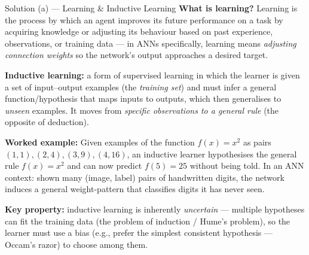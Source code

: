 \documentclass[12pt,a4paper]{article}
\begin{document}
\begin{solbox}{Solution (a) --- Learning \& Inductive Learning}
\textbf{What is learning?} Learning is the process by which an agent improves its future performance on a task by acquiring knowledge or adjusting its behaviour based on past experience, observations, or training data --- in ANNs specifically, learning means \emph{adjusting connection weights} so the network's output approaches a desired target.

\textbf{Inductive learning:} a form of supervised learning in which the learner is given a set of input--output examples (the \emph{training set}) and must infer a general function/hypothesis that maps inputs to outputs, which then generalises to \emph{unseen} examples. It moves from \emph{specific observations to a general rule} (the opposite of deduction).

\textbf{Worked example:} Given examples of the function $f(x) = x^2$ as pairs $(1,1),(2,4),(3,9),(4,16)$, an inductive learner hypothesises the general rule $f(x)=x^2$ and can now predict $f(5)=25$ without being told. In an ANN context: shown many (image, label) pairs of handwritten digits, the network induces a general weight-pattern that classifies digits it has never seen.

\textbf{Key property:} inductive learning is inherently \emph{uncertain} --- multiple hypotheses can fit the training data (the problem of induction / Hume's problem), so the learner must use a bias (e.g., prefer the simplest consistent hypothesis --- Occam's razor) to choose among them.
\end{solbox}
\end{document}
